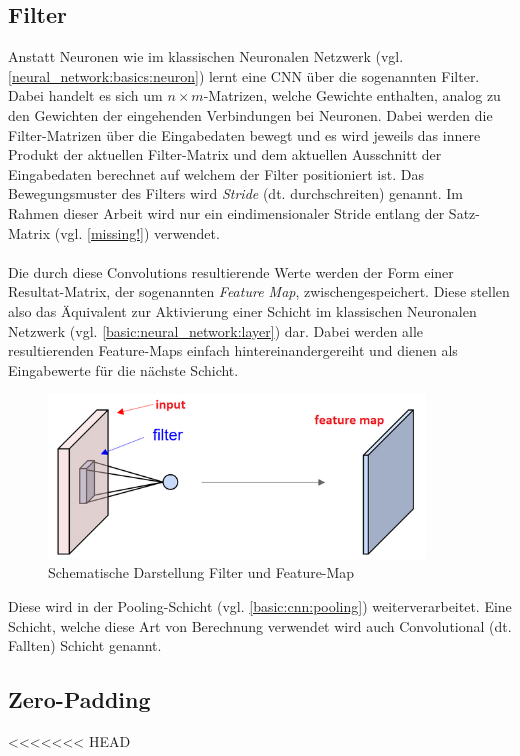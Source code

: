 \subsection{Filter}
\label{basic:cnn:filter}
Anstatt Neuronen wie im klassischen Neuronalen Netzwerk (vgl. \ref{neural_network:basics:neuron}) lernt eine CNN über die sogenannten Filter. Dabei handelt es sich um $n\times m$-Matrizen, welche Gewichte enthalten, analog zu den Gewichten der eingehenden Verbindungen bei Neuronen. Dabei werden die Filter-Matrizen über die Eingabedaten bewegt und es wird jeweils das innere Produkt der aktuellen Filter-Matrix und dem aktuellen Ausschnitt der Eingabedaten berechnet auf welchem der Filter positioniert ist. Das Bewegungsmuster des Filters wird \emph{Stride} (dt. durchschreiten) genannt. Im Rahmen dieser Arbeit wird nur ein eindimensionaler Stride entlang der Satz-Matrix (vgl. \ref{missing!}) verwendet.\\\\
Die durch diese Convolutions resultierende Werte werden der Form einer Resultat-Matrix, der sogenannten \emph{Feature Map}, zwischengespeichert. Diese stellen also das Äquivalent zur Aktivierung einer Schicht im klassischen Neuronalen Netzwerk (vgl. \ref{basic:neural_network:layer}) dar. Dabei werden alle resultierenden Feature-Maps einfach hintereinandergereiht und dienen als Eingabewerte für die nächste Schicht. 

\begin{figure}[h]
	\centering
	\includegraphics[width=10cm]{img/filter_feature_map}
	\caption{Schematische Darstellung Filter und Feature-Map}
\end{figure}

Diese wird in der Pooling-Schicht (vgl. \ref{basic:cnn:pooling}) weiterverarbeitet. Eine Schicht, welche diese Art von Berechnung verwendet wird auch Convolutional (dt. Fallten) Schicht genannt.
\subsection{Zero-Padding}
\blindtext
<<<<<<< HEAD
